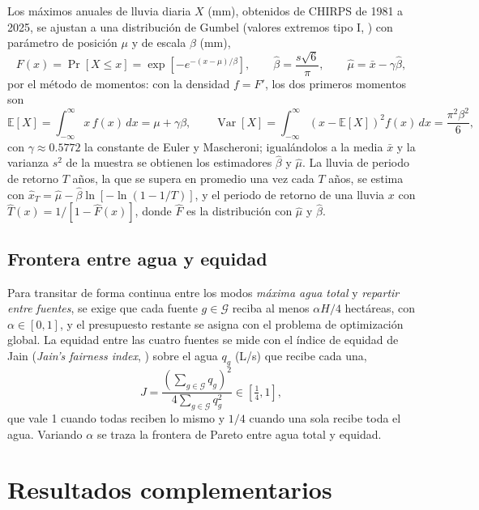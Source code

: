 Los máximos anuales de lluvia diaria $X$ (mm), obtenidos de CHIRPS de 1981 a 2025, se ajustan a una distribución de Gumbel (valores extremos tipo I, ) con parámetro de posición $\mu$ y de escala $\beta$ (mm),
\begin{equation}
F(x)=\Pr[X\le x]=\exp\!\left[-e^{-(x-\mu)/\beta}\right],\qquad \hat\beta=\frac{s\sqrt6}{\pi},\qquad \hat\mu=\bar x-\gamma\hat\beta,
\end{equation}
por el método de momentos: con la densidad $f=F'$, los dos primeros momentos son
\begin{equation}
\mathbb E[X]=\int_{-\infty}^{\infty}x\,f(x)\,dx=\mu+\gamma\beta,\qquad \operatorname{Var}[X]=\int_{-\infty}^{\infty}(x-\mathbb E[X])^2 f(x)\,dx=\frac{\pi^2\beta^2}{6},
\end{equation}
con $\gamma\approx0.5772$ la constante de Euler y Mascheroni; igualándolos a la media $\bar x$ y la varianza $s^2$ de la muestra se obtienen los estimadores $\hat\beta$ y $\hat\mu$. La lluvia de periodo de retorno $T$ años, la que se supera en promedio una vez cada $T$ años, se estima con $\hat x_T=\hat\mu-\hat\beta\ln[-\ln(1-1/T)]$, y el periodo de retorno de una lluvia $x$ con $\hat T(x)=1/[1-\hat F(x)]$, donde $\hat F$ es la distribución con $\hat\mu$ y $\hat\beta$.

\subsection{Frontera entre agua y equidad}\label{sec:pareto}

Para transitar de forma continua entre los modos \emph{máxima agua total} y \emph{repartir entre fuentes}, se exige que cada fuente $g\in\mathcal G$ reciba al menos $\alpha H/4$ hectáreas, con $\alpha\in[0,1]$, y el presupuesto restante se asigna con el problema de optimización global. La equidad entre las cuatro fuentes se mide con el índice de equidad de Jain (\emph{Jain's fairness index}, ) sobre el agua $q_g$ (L/s) que recibe cada una,
\begin{equation}
J=\frac{\left(\sum_{g\in\mathcal G} q_g\right)^2}{4\sum_{g\in\mathcal G} q_g^2}\in\left[\tfrac14,1\right],
\end{equation}
que vale 1 cuando todas reciben lo mismo y $1/4$ cuando una sola recibe toda el agua. Variando $\alpha$ se traza la frontera de Pareto entre agua total y equidad.


\section{Resultados complementarios}\label{ap:resultados}

